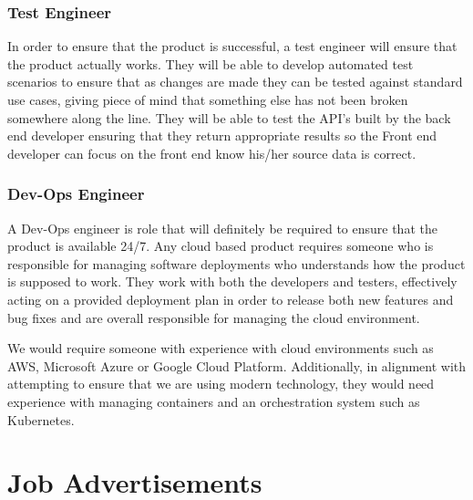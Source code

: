 \documentclass[11pt, oneside, a4paper, titlepage]{article}
\begin{document}
\subsubsection{Test Engineer}
In order to ensure that the product is successful, a test engineer will ensure that the product actually works.  They will be able to develop automated test scenarios to ensure that as changes are made they can be tested against standard use cases, giving piece of mind that something else has not been broken somewhere along the line.  They will be able to test the API's built by the back end developer ensuring that they return appropriate results so the Front  end developer can focus on the front end know his/her source data is correct. 

\subsubsection{Dev-Ops Engineer}
A Dev-Ops engineer is role that will definitely be required to ensure that the product is available 24/7.  Any cloud based product requires someone who is responsible for managing software deployments who understands how the product is supposed to work.  They work with both the developers and testers, effectively acting on a provided deployment plan in order to release both new features and bug fixes and are overall responsible for managing the cloud environment. 

We would require someone with experience with cloud environments such as AWS, Microsoft Azure or Google Cloud Platform.  Additionally, in alignment with attempting to ensure that we are using modern technology, they would need experience with managing containers and an orchestration system such as Kubernetes. 
\newpage

\section{Job Advertisements}
\end{document}
